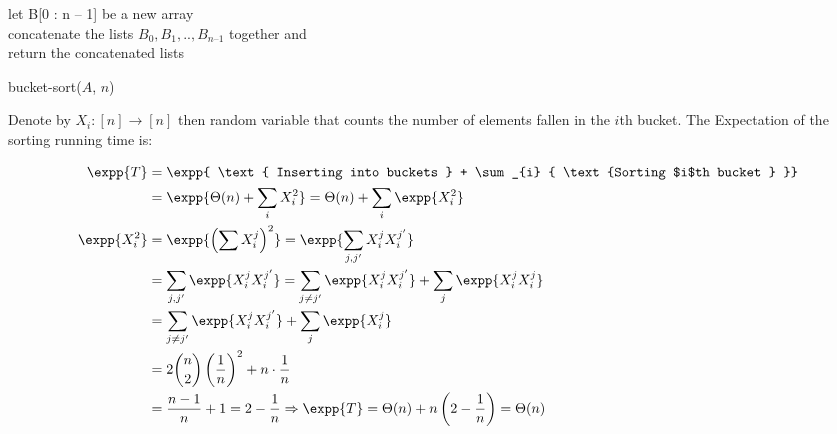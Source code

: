 \begin{example}
\end{example}
\begin{example}
\end{example}

\begin{algorithm}
    	let B[0 : n – 1] be a new array \\
	\For{ $i \leftarrow [1, n]$}{
	    insert $A_{i}$ into list $B_{ \lfloor n A_{i} \rfloor} ]$
       	}
	concatenate the lists $B_{0}, B_{1}, .. , B_{n – 1}$ together and\\
	return the concatenated lists
\caption{bucket-sort($A$, $n$)}
  \end{algorithm}

  Denote by $X_{i} : [n] \rightarrow [n]$ then random variable that counts the number of elements fallen in the $i$th bucket. The Expectation of the sorting running time is:   
  
  \begin{equation*}
    \begin{split}
    \expp{T} &= \expp{  \text{ Inserting into buckets  }   +   \sum_{i} { \text{Sorting $i$th bucket  } }} \\ 
    & = \expp{ \Theta(n) +   \sum_{i} { X_{i}^{2}  }} = \Theta(n) +  \sum_{i}{ \expp{X_{i}^{2}} }  \\
  \expp{X_{i}^{2}} &= \expp{\left( \sum X_{i}^{j} \right)^{2}} = \expp{\sum_{j,j^{\prime}} X_{i}^{j} X_{i}^{j^{\prime}} } \\ 
  & =  \sum_{j, j^{\prime}} \expp{X_{i}^{j} X_{i}^{j^{\prime}}} = \sum_{j \neq j^{\prime}} \expp{X_{i}^{j} X_{i}^{j^{\prime}}} + \sum_{j} \expp{X_{i}^{j} X_{i}^{j}} \\
    & =  \sum_{j \neq j^{\prime}} \expp{X_{i}^{j} X_{i}^{j^{\prime}}} + \sum_{j} \expp{X_{i}^{j}}  \\
        & = 2 { n \choose 2  } \left( \frac{1}{n} \right)^{2} +  n\cdot \frac{1}{n} \\ 
        & = \frac{n-1}{n} + 1  = 2 - \frac{1}{n} \Rightarrow \expp{T} = \Theta(n) + n\left( 2 - \frac{1}{n} \right) = \Theta(n)
    \end{split}
  \end{equation*}




